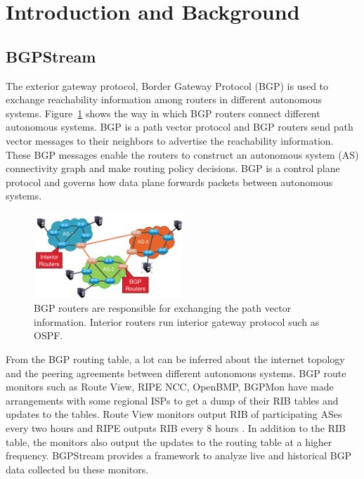 \section{Introduction and Background}\label{sec:introduction}
  \subsection{BGPStream}
 The exterior gateway protocol, Border Gateway Protocol (BGP) is used to exchange reachability information among routers in different autonomous systems. Figure~\ref{fig:bgp_router} shows the way in which BGP routers connect different autonomous systems. BGP is a path vector protocol and BGP routers send path vector messages to their neighbors to advertise the reachability information. These BGP messages enable the routers to construct an autonomous system (AS) connectivity graph and make routing policy decisions. BGP is a control plane protocol and governs how data plane forwards packets between autonomous systems. 
 \begin{figure}
	\includegraphics[width=0.5\textwidth]{Interior_and_BGP_routers.png}
	\caption{BGP routers are responsible for exchanging the path vector information. Interior routers run interior gateway protocol such as OSPF.}
	\label{fig:bgp_router}
\end{figure}
From the BGP routing table, a lot can be inferred about the internet topology and the peering agreements between different autonomous systems. BGP route monitors such as Route View, RIPE NCC, OpenBMP, BGPMon have made arrangements with some regional ISPs to get a dump of their RIB tables and updates to the tables. Route View monitors output RIB of participating ASes every two hours and RIPE outputs RIB every 8 hours \cite{orsini_bgpstream:_2016}. In addition to the RIB table, the monitors also output the updates to the routing table at a higher frequency. BGPStream provides a framework to analyze live and historical BGP data collected bu these monitors.  
